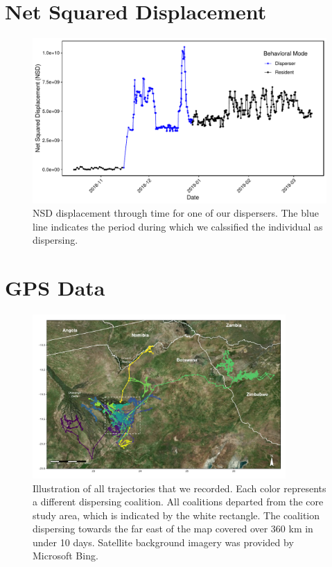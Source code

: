 \documentclass[abstract=off,10pt,a4paper,bibliography=totocnumbered]{article}
\begin{document}
\section{Net Squared Displacement}
\begin{figure}[hbpt]
  \begin{center}
    \includegraphics[width = \textwidth]{99_NSD.pdf}
    \caption{NSD displacement through time for one of our dispersers. The blue
    line indicates the period during which we calssified the individual as
    dispersing.}
    \label{NSD}
  \end{center}
\end{figure}

\newpage
\section{GPS Data}
\begin{figure}[hbtp]
  \begin{center}
    \includegraphics[width = 0.86\textwidth]{99_Trajectories.pdf}
    \caption{Illustration of all trajectories that we recorded. Each color
    represents a different dispersing coalition. All coalitions departed from
    the core study area, which is indicated by the white rectangle. The
    coalition dispersing towards the far east of the map covered over 360 km in
    under 10 days. Satellite background imagery was provided by Microsoft Bing.}
    \label{Trajectories}
  \end{center}
\end{figure}
\end{document}
